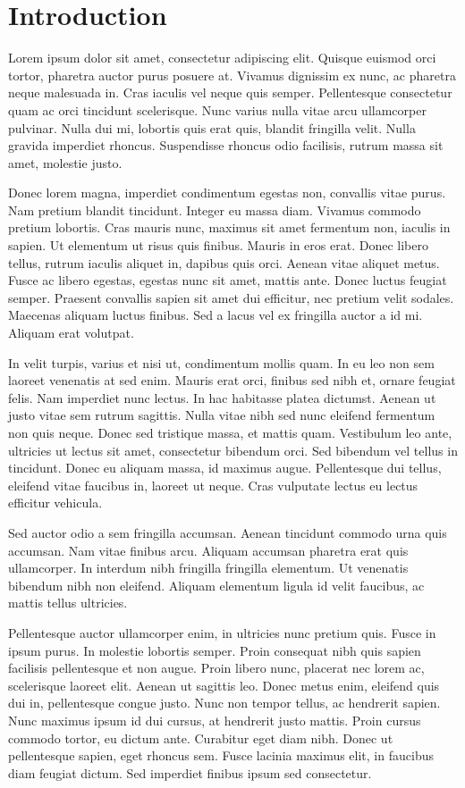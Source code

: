 \chapter*{Introduction}
Lorem ipsum dolor sit amet, consectetur adipiscing elit. Quisque euismod orci tortor, pharetra auctor purus posuere at. Vivamus dignissim ex nunc, ac pharetra neque malesuada in. Cras iaculis vel neque quis semper. Pellentesque consectetur quam ac orci tincidunt scelerisque. Nunc varius nulla vitae arcu ullamcorper pulvinar. Nulla dui mi, lobortis quis erat quis, blandit fringilla velit. Nulla gravida imperdiet rhoncus. Suspendisse rhoncus odio facilisis, rutrum massa sit amet, molestie justo.

Donec lorem magna, imperdiet condimentum egestas non, convallis vitae purus. Nam pretium blandit tincidunt. Integer eu massa diam. Vivamus commodo pretium lobortis. Cras mauris nunc, maximus sit amet fermentum non, iaculis in sapien. Ut elementum ut risus quis finibus. Mauris in eros erat. Donec libero tellus, rutrum iaculis aliquet in, dapibus quis orci. Aenean vitae aliquet metus. Fusce ac libero egestas, egestas nunc sit amet, mattis ante. Donec luctus feugiat semper. Praesent convallis sapien sit amet dui efficitur, nec pretium velit sodales. Maecenas aliquam luctus finibus. Sed a lacus vel ex fringilla auctor a id mi. Aliquam erat volutpat.

In velit turpis, varius et nisi ut, condimentum mollis quam. In eu leo non sem laoreet venenatis at sed enim. Mauris erat orci, finibus sed nibh et, ornare feugiat felis. Nam imperdiet nunc lectus. In hac habitasse platea dictumst. Aenean ut justo vitae sem rutrum sagittis. Nulla vitae nibh sed nunc eleifend fermentum non quis neque. Donec sed tristique massa, et mattis quam. Vestibulum leo ante, ultricies ut lectus sit amet, consectetur bibendum orci. Sed bibendum vel tellus in tincidunt. Donec eu aliquam massa, id maximus augue. Pellentesque dui tellus, eleifend vitae faucibus in, laoreet ut neque. Cras vulputate lectus eu lectus efficitur vehicula.

Sed auctor odio a sem fringilla accumsan. Aenean tincidunt commodo urna quis accumsan. Nam vitae finibus arcu. Aliquam accumsan pharetra erat quis ullamcorper. In interdum nibh fringilla fringilla elementum. Ut venenatis bibendum nibh non eleifend. Aliquam elementum ligula id velit faucibus, ac mattis tellus ultricies.

Pellentesque auctor ullamcorper enim, in ultricies nunc pretium quis. Fusce in ipsum purus. In molestie lobortis semper. Proin consequat nibh quis sapien facilisis pellentesque et non augue. Proin libero nunc, placerat nec lorem ac, scelerisque laoreet elit. Aenean ut sagittis leo. Donec metus enim, eleifend quis dui in, pellentesque congue justo. Nunc non tempor tellus, ac hendrerit sapien. Nunc maximus ipsum id dui cursus, at hendrerit justo mattis. Proin cursus commodo tortor, eu dictum ante. Curabitur eget diam nibh. Donec ut pellentesque sapien, eget rhoncus sem. Fusce lacinia maximus elit, in faucibus diam feugiat dictum. Sed imperdiet finibus ipsum sed consectetur.